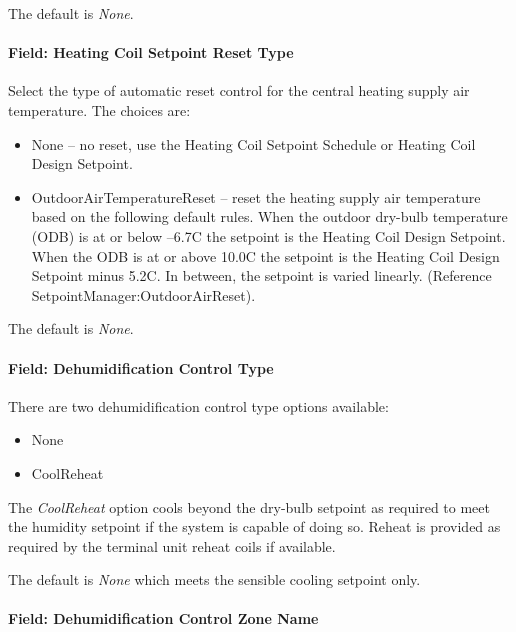 The default is \emph{None}.

\paragraph{Field: Heating Coil Setpoint Reset Type}\label{field-heating-coil-setpoint-reset-type}

Select the type of automatic reset control for the central heating supply air temperature. The choices are:

\begin{itemize}
\item
  None -- no reset, use the Heating Coil Setpoint Schedule or Heating Coil Design Setpoint.
\item
  OutdoorAirTemperatureReset -- reset the heating supply air temperature based on the following default rules. When the outdoor dry-bulb temperature (ODB) is at or below --6.7C the setpoint is the Heating Coil Design Setpoint. When the ODB is at or above 10.0C the setpoint is the Heating Coil Design Setpoint minus 5.2C. In between, the setpoint is varied linearly. (Reference SetpointManager:OutdoorAirReset).
\end{itemize}

The default is \emph{None}.

\paragraph{Field: Dehumidification Control Type}\label{field-dehumidification-control-type-3}

There are two dehumidification control type options available:

\begin{itemize}
\item
  None
\item
  CoolReheat
\end{itemize}

The \emph{CoolReheat} option cools beyond the dry-bulb setpoint as required to meet the humidity setpoint if the system is capable of doing so. Reheat is provided as required by the terminal unit reheat coils if available.

The default is \emph{None} which meets the sensible cooling setpoint only.

\paragraph{Field: Dehumidification Control Zone Name}\label{field-dehumidification-control-zone-name-2}


